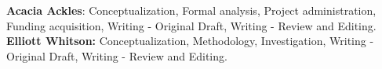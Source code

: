 \textbf{Acacia Ackles}: Conceptualization, Formal analysis, Project administration, Funding acquisition, Writing - Original Draft, Writing - Review and Editing. \textbf{Elliott Whitson:} Conceptualization, Methodology, Investigation, Writing - Original Draft, Writing - Review and Editing.